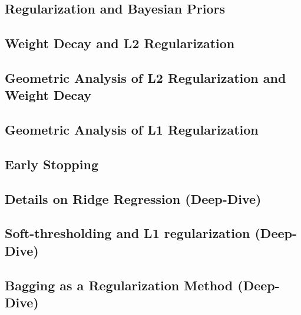 \subsection{Regularization and Bayesian Priors}


\subsection{Weight Decay and L2 Regularization}


\subsection{Geometric Analysis of L2 Regularization and Weight Decay}


\subsection{Geometric Analysis of L1 Regularization}


\subsection{Early Stopping}


\subsection{Details on Ridge Regression (Deep-Dive)}


\subsection{Soft-thresholding and L1 regularization (Deep-Dive)}


\subsection{Bagging as a Regularization Method (Deep-Dive)}







